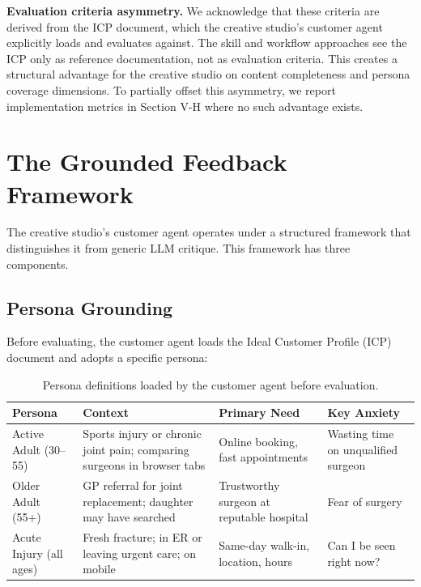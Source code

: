 \documentclass[conference]{IEEEtran}
\begin{document}
\textbf{Evaluation criteria asymmetry.} We acknowledge that these criteria are derived from the ICP document, which the creative studio's customer agent explicitly loads and evaluates against. The skill and workflow approaches see the ICP only as reference documentation, not as evaluation criteria. This creates a structural advantage for the creative studio on content completeness and persona coverage dimensions. To partially offset this asymmetry, we report implementation metrics in Section V-H where no such advantage exists.

\section{The Grounded Feedback Framework}\label{the-grounded-feedback-framework}

The creative studio's customer agent operates under a structured framework that distinguishes it from generic LLM critique. This framework has three components.

\subsection{Persona Grounding}\label{persona-grounding}

Before evaluating, the customer agent loads the Ideal Customer Profile (ICP) document and adopts a specific persona:

\begin{table}[htbp]
\caption{Persona definitions loaded by the customer agent before evaluation.}
\centering
\footnotesize
\begin{tabular}{>{\raggedright\arraybackslash}p{}>{\raggedright\arraybackslash}p{}>{\raggedright\arraybackslash}p{}>{\raggedright\arraybackslash}p{}}
\toprule
Persona & Context & Primary Need & Key Anxiety \\
\midrule
Active Adult (30--55) & Sports injury or chronic joint pain; comparing surgeons in browser tabs & Online booking, fast appointments & Wasting time on unqualified surgeon \\
Older Adult (55+) & GP referral for joint replacement; daughter may have searched & Trustworthy surgeon at reputable hospital & Fear of surgery \\
Acute Injury (all ages) & Fresh fracture; in ER or leaving urgent care; on mobile & Same-day walk-in, location, hours & Can I be seen right now? \\
\bottomrule
\end{tabular}
\end{table}
\end{document}
